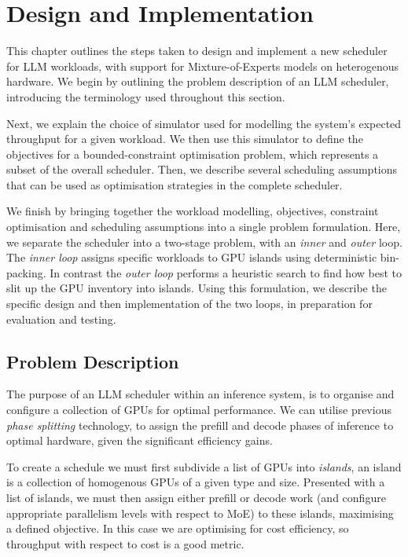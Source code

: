 \graphicspath{{chapters/04design/graphs}}

\chapter{Design and Implementation}


This chapter outlines the steps taken to design and implement a new scheduler for LLM workloads, with support for Mixture-of-Experts models on heterogenous hardware.
We begin by outlining the problem description of an LLM scheduler, introducing the terminology used throughout this section. 

Next, we explain the choice of simulator used for modelling the system's expected throughput for a given workload.
We then use this simulator to define the objectives for a bounded-constraint optimisation problem, which represents a subset of the overall scheduler.
Then, we describe several scheduling assumptions that can be used as optimisation strategies in the complete scheduler.

We finish by bringing together the workload modelling, objectives, constraint optimisation and scheduling assumptions into a single problem formulation.
Here, we separate the scheduler into a two-stage problem, with an \textit{inner} and \textit{outer} loop.
The \textit{inner loop} assigns specific workloads to GPU islands using deterministic bin-packing.
In contrast the \textit{outer loop} performs a heuristic search to find how best to slit up the GPU inventory into islands.
Using this formulation, we describe the specific design and then implementation of the two loops, in preparation for evaluation and testing.

\section{Problem Description}

The purpose of an LLM scheduler within an inference system, is to organise and configure a collection of GPUs for optimal performance.
We can utilise previous \textit{phase splitting} technology, to assign the prefill and decode phases of inference to optimal hardware, given the significant efficiency gains. 

To create a schedule we must first subdivide a list of GPUs into \textit{islands}, an island is a collection of homogenous GPUs of a given type and size.
Presented with a list of islands, we must then assign either prefill or decode work (and configure appropriate parallelism levels with respect to MoE) to these islands, maximising a defined objective.
In this case we are optimising for cost efficiency, so throughput with respect to cost is a good metric.

